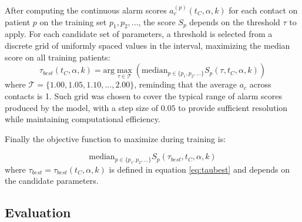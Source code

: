 After computing the continuous alarm scores $a^{(p)}_c(t_C,\alpha,k)$ for each
contact on patient $p$ on the training set ${p_1,p_2,...}$, the score $S_p$
depends on the threshold $\tau$ to apply.
For each candidate set of parameters, a threshold is selected from a discrete
grid of uniformly spaced values in the interval, maximizing the median score on
all training patients:
\begin{equation}\label{eq:taubest}
    \tau_{best}(t_C,\alpha,k)=\text{arg}\max_{\tau\in\mathcal{T}}
    \left(\text{median}_{p\in\{p_1,p_2,...\}}S_p(\tau,t_C,\alpha,k)\right)
\end{equation}
where $\mathcal{T}=\{1.00, 1.05, 1.10,..., 2.00\}$, reminding that the average
$a_c$ across contacts is 1.
Such grid was chosen to cover the typical range of alarm scores produced by the
model, with a step size of $0.05$ to provide sufficient resolution while
maintaining computational efficiency.

Finally the objective function to maximize during training is:

\begin{equation}
    \text{median}_{p\in\{p_1,p_2,...\}}S_p
    \left(\tau_{best},t_C,\alpha,k\right)
\end{equation}
where $\tau_{best} = \tau_{best}(t_C,\alpha,k)$ is defined in equation
\ref{eq:taubest} and depends on the candidate parameters.


\subsection{Evaluation}

